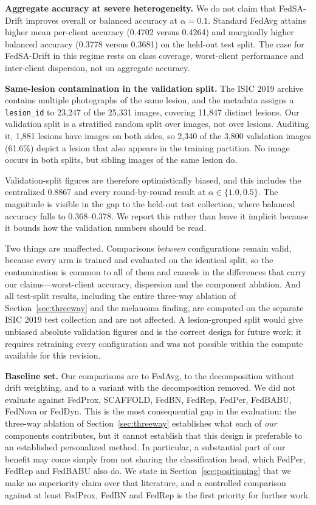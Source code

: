 \documentclass{ieeeaccess}
\newcommand{\sadrift}{FedSA-Drift}
\begin{document}
\textbf{Aggregate accuracy at severe heterogeneity.} We do not claim that \sadrift{} improves overall or balanced accuracy at $\alpha = 0.1$. Standard FedAvg attains higher mean per-client accuracy (0.4702 versus 0.4264) and marginally higher balanced accuracy (0.3778 versus 0.3681) on the held-out test split. The case for \sadrift{} in this regime rests on class coverage, worst-client performance and inter-client dispersion, not on aggregate accuracy.

\textbf{Same-lesion contamination in the validation split.} The ISIC 2019 archive contains multiple photographs of the same lesion, and the metadata assigns a \texttt{lesion\_id} to 23,247 of the 25,331 images, covering 11,847 distinct lesions. Our validation split is a stratified random split over images, not over lesions. Auditing it, 1,881 lesions have images on both sides, so 2,340 of the 3,800 validation images (61.6\%) depict a lesion that also appears in the training partition. No image occurs in both splits, but sibling images of the same lesion do.

Validation-split figures are therefore optimistically biased, and this includes the centralized 0.8867 and every round-by-round result at $\alpha \in \{1.0, 0.5\}$. The magnitude is visible in the gap to the held-out test collection, where balanced accuracy falls to 0.368--0.378. We report this rather than leave it implicit because it bounds how the validation numbers should be read.

Two things are unaffected. Comparisons \emph{between} configurations remain valid, because every arm is trained and evaluated on the identical split, so the contamination is common to all of them and cancels in the differences that carry our claims---worst-client accuracy, dispersion and the component ablation. And all test-split results, including the entire three-way ablation of Section~\ref{sec:threeway} and the melanoma finding, are computed on the separate ISIC 2019 test collection and are not affected. A lesion-grouped split would give unbiased absolute validation figures and is the correct design for future work; it requires retraining every configuration and was not possible within the compute available for this revision.

\textbf{Baseline set.} Our comparisons are to FedAvg, to the decomposition without drift weighting, and to a variant with the decomposition removed. We did not evaluate against FedProx, SCAFFOLD, FedBN, FedRep, FedPer, FedBABU, FedNova or FedDyn. This is the most consequential gap in the evaluation: the three-way ablation of Section~\ref{sec:threeway} establishes what each of \emph{our} components contributes, but it cannot establish that this design is preferable to an established personalized method. In particular, a substantial part of our benefit may come simply from not sharing the classification head, which FedPer, FedRep and FedBABU also do. We state in Section~\ref{sec:positioning} that we make no superiority claim over that literature, and a controlled comparison against at least FedProx, FedBN and FedRep is the first priority for further work.
\end{document}
